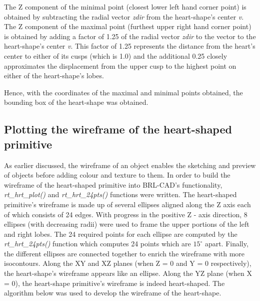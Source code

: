 \hspace{30} The   Z component   of   the   minimal   point   (closest   lower   left   hand   corner   point)   is  
obtained   by   subtracting   the   radial   vector \textit{zdir}  from   the   heart-­shape's   center  \textit{v}. The   Z  
component   of   the   maximal   point   (furthest   upper   right   hand   corner   point)   is  
obtained   by   adding a factor   of   1.25 of the radial vector \textit{zdir}  to   the   vector   to   the   heart­-shape's  
center \textit{v}. This   factor   of   1.25 represents   the   distance   from   the   heart's  
center   to   either   of   its   cusps   (which   is   1.0)   and   the   additional   0.25   closely  
approximates   the   displacement   from   the   upper   cusp   to   the   highest   point   on  
either   of   the heart-shape's   lobes.

Hence, with the coordinates of the maximal and minimal points obtained, the bounding box of the heart-­shape was obtained.

\subsection{Plotting the wireframe of the heart-­shaped primitive}

\hspace{30} As  earlier   discussed,   the   wireframe   of   an   object   enables   the  
sketching   and   preview   of   objects   before   adding   colour   and   texture   to   them.   In  
order   to   build   the   wireframe   of   the   heart-­shaped   primitive   into   BRL-­CAD's  
functionality, \textit{rt\_hrt\_plot()}   and   \textit{rt\_hrt\_24pts()}   functions were written.   The  
heart-­shaped   primitive's   wireframe   is   made   up   of   several   ellipses   aligned   along  
the   Z   axis   each   of   which   consists   of   24   edges. With  progress   in   the   positive  
 Z - ­axis   direction,   8   ellipses   (with   decreasing   radii) were used  to   frame   the   upper  
portions   of   the   left   and   right   lobes.   The   24   required   points   for   each   ellipse   are  
computed   by   the   \textit{rt\_hrt\_24pts()} function which computes 24 points which are $15^{\circ}$ apart.
Finally,   the   different   ellipses   are  connected   together   to   enrich   the   wireframe   
with   more   iso­contours.   Along   the  XY   and   XZ   planes   (when   Z   =   0   and   Y   =   0   respectively), the   heart-­shape's  wireframe   appears   like   an   ellipse.   Along   the   YZ   plane   (when   X   =   0),   the  
heart-­shape   primitive's   wireframe   is   indeed   heart­-shaped.   The   algorithm   below  
was used to develop the wireframe of the heart­-shape.  

